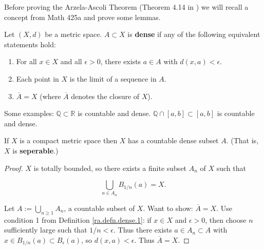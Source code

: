 %
%
%
%
%
%
%
%


Before proving the Arzela-Ascoli Theorem (Theorem 4.14 in \citet{pugh2015real}) we will recall a concept from Math 425a and prove some lemmas.

\begin{definition}\label{ra.defn.dense.1}

Let \((X, d)\) be a metric space. \(A \subset X\) is \textbf{dense} if any of the following equivalent statements hold:

\begin{enumerate}

\item For all \(x \in X\) and all \(\epsilon > 0\), there exists \(a \in A\) with \(d(x,a) < \epsilon\).

\item Each point in \(X\) is the limit of a sequence in \(A\).

\item \(\overline{A} = X\) (where \(\overline{A}\) denotes the closure of \(X\)). 

\end{enumerate}

\end{definition}

\begin{example}

Some examples: \(\mathbb{Q} \subset \mathbb{R}\) is countable and dense. \(\mathbb{Q} \cap [a,b] \subset [a,b]\) is countable and dense.

\end{example}

\begin{lemma}\label{ra.cmpct.count.dens.sset}

If \(X\) is a compact metric space then \(X\) has a countable dense subset \(A\). (That is, \(X\) is \textbf{seperable}.) 

\end{lemma}

\begin{proof}

\(X\) is totally bounded, so there exists a finite subset \(A_n\)  of \(X\) such that

\[
\bigcup_{a \in A_n}  B_{1/n}(a)  = X.
\]

Let \(A := \bigcup_{n \geq 1} A_n\), a countable subset of \(X\). Want to show: \(\overline{A} = X\). Use condition 1 from Definition \ref{ra.defn.dense.1}: if \(x \in X\) and \(\epsilon > 0\), then choose \(n \) sufficiently large such that \(1/n < \epsilon\). Thus there exists \(a \in A_n \subset A\) with \(x \in B_{1/n}(a) \subset B_\epsilon(a)\), so \(d(x, a) < \epsilon\). Thus \(\overline{A} = X\).

\end{proof}


